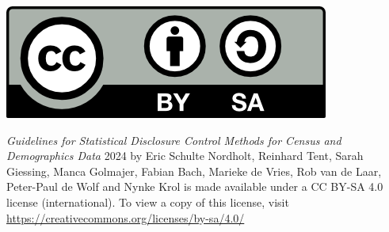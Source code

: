 \documentclass[openany,oneside]{book}
\begin{document}
\noindent\includegraphics[scale=0.5]{by-sa.png}

\noindent 
\textit{Guidelines for Statistical Disclosure Control Methods for Census and Demographics Data} \ccCopy{} 2024 by Eric Schulte Nordholt, Reinhard Tent, Sarah Giessing, Manca Golmajer, Fabian Bach, Marieke de Vries, Rob van de Laar, Peter-Paul de Wolf and Nynke Krol is made available under a CC BY-SA 4.0 license (international). To view a copy of this license, visit \url{https://creativecommons.org/licenses/by-sa/4.0/}

\newpage

\tableofcontents



%





%









\end{document}
